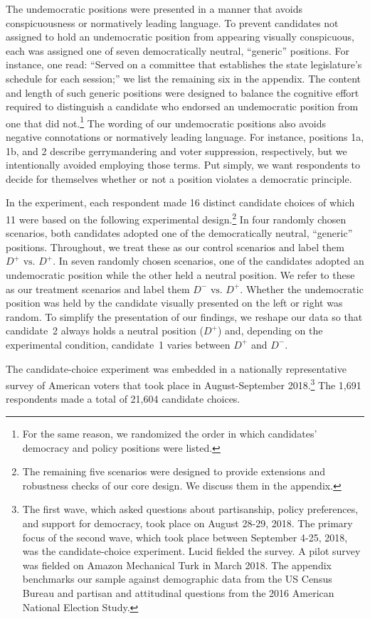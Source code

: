 \documentclass[letterpaper, 12pt]{article}
\begin{document}
\begin{raggedright}
\begin{description}[style=unboxed,leftmargin=0em,itemsep=0em]
\item [Neutral presentation:] The undemocratic positions were presented in a manner that avoids conspicuousness or normatively leading language. To prevent candidates not assigned to hold an undemocratic position from appearing visually conspicuous, each was assigned one of seven democratically neutral, ``generic'' positions. For instance, one read: ``Served on a committee that establishes the state legislature's schedule for each session;'' we list the remaining six in the appendix. The content and length of such generic positions were designed to balance the cognitive effort required to distinguish a candidate who endorsed an undemocratic position from one that did not.\footnote{For the same reason, we randomized the order in which candidates' democracy and policy positions were listed.} The wording of our undemocratic positions also avoids negative connotations or normatively leading language. For instance, positions 1a, 1b, and 2 describe gerrymandering and voter suppression, respectively, but we intentionally avoided employing those terms. Put simply, we want respondents to decide for themselves whether or not a position violates a democratic principle.
\end{description}

In the experiment, each respondent made 16 distinct candidate choices of which 11 were based on the following experimental design.\footnote{The remaining five scenarios were designed to provide extensions and robustness checks of our core design. We discuss them in the appendix.} In four randomly chosen scenarios, both candidates adopted one of the democratically neutral, ``generic'' positions. Throughout, we treat these as our control scenarios and label them $D^+ \text{ vs. } D^+$. In seven randomly chosen scenarios, one of the candidates adopted an undemocratic position while the other held a neutral position. We refer to these as our treatment scenarios and label them $D^- \text{ vs. } D^+$. Whether the undemocratic position was held by the candidate visually presented on the left or right was random. To simplify the presentation of our findings, we reshape our data so that candidate~2 always holds a neutral position ($D^+$) and, depending on the experimental condition, candidate~1 varies between $D^+$ and $D^-$.

The candidate-choice experiment was embedded in a nationally representative survey of American voters that took place in August-September 2018.\footnote{The first wave, which asked questions about partisanship, policy preferences, and support for democracy, took place on August 28-29, 2018. The primary focus of the second wave, which took place between September 4-25, 2018, was the candidate-choice experiment. Lucid fielded the survey. A pilot survey was fielded on Amazon Mechanical Turk in March 2018. The appendix benchmarks our sample against demographic data from the US Census Bureau and partisan and attitudinal questions from the 2016 American National Election Study.} The 1,691 respondents made a total of 21,604 candidate choices.


\end{raggedright}
\end{document}
